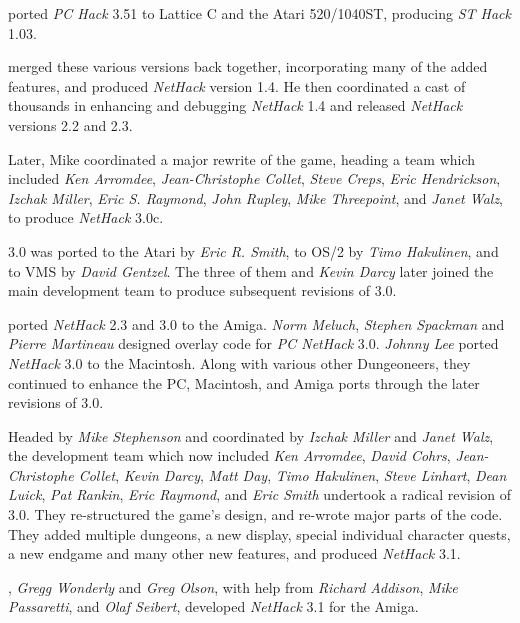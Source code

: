 \medskip
{} ported {\it PC Hack\/} 3.51 to Lattice C and the Atari
520/1040ST, producing {\it ST Hack\/} 1.03.

\medskip
{} merged these various versions back together,
incorporating many of the added features, and produced {\it NetHack\/} version
1.4.  He then coordinated a cast of thousands in enhancing and debugging
{\it NetHack\/} 1.4 and released {\it NetHack\/} versions 2.2 and 2.3.

\medskip
\nd Later, Mike coordinated a major rewrite of the game, heading a team which
included {\it Ken Arromdee}, {\it Jean-Christophe Collet}, {\it Steve Creps},
{\it Eric Hendrickson}, {\it Izchak Miller}, {\it Eric S. Raymond}, {\it John
Rupley}, {\it Mike Threepoint}, and {\it Janet Walz}, to produce {\it
NetHack\/} 3.0c.

\medskip
{} 3.0 was ported to the Atari by {\it Eric R. Smith}, to OS/2 by
{\it Timo Hakulinen}, and to VMS by {\it David Gentzel}.  The three of them
and {\it Kevin Darcy\/} later joined the main development team to produce
subsequent revisions of 3.0.

\medskip
{} ported {\it NetHack\/} 2.3 and 3.0 to the Amiga.  {\it
Norm Meluch}, {\it Stephen Spackman\/} and {\it Pierre Martineau\/} designed
overlay code for {\it PC NetHack\/} 3.0.  {\it Johnny Lee\/} ported {\it
NetHack\/} 3.0 to the Macintosh.  Along with various other Dungeoneers, they
continued to enhance the PC, Macintosh, and Amiga ports through the later
revisions of 3.0.

\medskip
\nd Headed by {\it Mike Stephenson\/} and coordinated by {\it Izchak Miller\/} and
{\it Janet Walz}, the development team which now included {\it Ken Arromdee},
{\it David Cohrs}, {\it Jean-Christophe Collet}, {\it Kevin Darcy},
{\it Matt Day}, {\it Timo Hakulinen}, {\it Steve Linhart}, {\it Dean Luick},
{\it Pat Rankin}, {\it Eric Raymond}, and {\it Eric Smith\/} undertook a radical
revision of 3.0.  They re-structured the game's design, and re-wrote major
parts of the code.  They added multiple dungeons, a new display, special
individual character quests, a new endgame and many other new features, and
produced {\it NetHack\/} 3.1.

\medskip
{}, {\it Gregg Wonderly\/} and {\it Greg Olson}, with help
from {\it Richard Addison}, {\it Mike Passaretti}, and {\it Olaf Seibert},
developed {\it NetHack\/} 3.1 for the Amiga.

